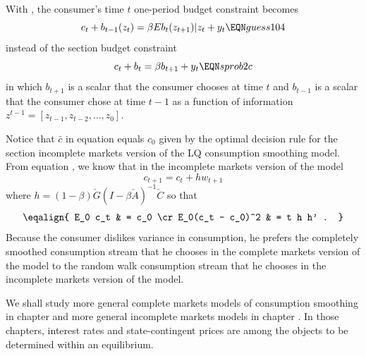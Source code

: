 With   , the
consumer's time $t$ one-period budget constraint   becomes
$$ c_t + b_{t-1}(z_t) = \beta E b_t(z_{t+1}) | z_t  + y_t  \EQN guess104 $$
instead of the section 
  budget constraint
$$ c_t + b_t = \beta b_{t+1}  + y_t \EQN sprob2c $$
in which  $b_{t+1}$ is a scalar that the consumer chooses at time $t$ and $b_{t-1}$ is a scalar that the consumer chose at time $t-1$
as a function of information $z^{t-1} = [z_{t-1}, z_{t-2}, \ldots, z_0]$. 


Notice that $\bar c$ in equation  equals $c_0$ given by the optimal decision rule  for the section
 incomplete markets version
of the LQ consumption smoothing model.   From equation , we know that in the incomplete markets version of the model
$$ c_{t+1} = c_t + h w_{t+1} $$
where $h = (1-\beta) \check G (I - \beta \check A)^{-1} \check C $
so that
$$ \eqalign{ E_0 c_t & = c_0 \cr
              E_0(c_t  - c_0)^2 & = t h h' . } $$
Because the consumer dislikes variance in consumption, he prefers the completely smoothed   consumption stream  that he chooses in the complete markets version of the model to the random walk consumption stream that he chooses in the incomplete markets version of the
 model.


We shall study  more general complete markets models of consumption smoothing in chapter 
and more general incomplete markets models in chapter
.  In those chapters, interest rates and state-contingent prices are among
the objects to be  determined within an  equilibrium.



%
